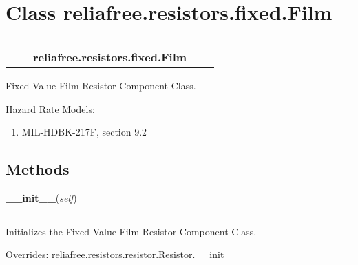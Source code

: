 %
%
%


\section{Class reliafree.resistors.fixed.Film}

    \label{reliafree:resistors:fixed:Film}
\begin{tabular}{cccccc}
\multicolumn{2}{r}{\settowidth{\BCL}{reliafree.resistors.resistor.Resistor}\multirow{2}{\BCL}{reliafree.resistors.resistor.Resistor}}
&&
  \\\cline{3-3}
  &&\multicolumn{1}{c|}{}
&&
  \\
&&\multicolumn{2}{l}{\textbf{reliafree.resistors.fixed.Film}}
\end{tabular}

Fixed Value Film Resistor Component Class.

Hazard Rate Models:

\begin{enumerate}

\setlength{\parskip}{0.5ex}
  \item MIL-HDBK-217F, section 9.2

\end{enumerate}



  \subsection{Methods}

    \vspace{0.5ex}

\hspace{.8\funcindent}\begin{boxedminipage}{\funcwidth}

    \raggedright \textbf{\_\_init\_\_}(\textit{self})

    \vspace{-1.5ex}

    \rule{\textwidth}{0.5\fboxrule}
\setlength{\parskip}{2ex}
    Initializes the Fixed Value Film Resistor Component Class.

\setlength{\parskip}{1ex}
      Overrides: reliafree.resistors.resistor.Resistor.\_\_init\_\_

    \end{boxedminipage}

